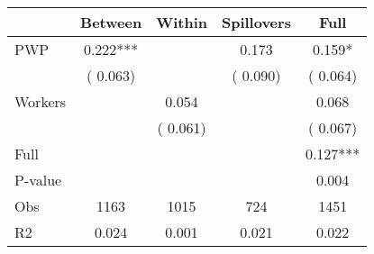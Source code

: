 
\begin{tabular}{l*{4}{c}}\hline&\multicolumn{1}{c}{Between}&\multicolumn{1}{c}{Within}&\multicolumn{1}{c}{Spillovers}&\multicolumn{1}{c}{Full}\\ \hline
 PWP           &              0.222***      &                                               &        0.173 &         0.159*                            \\ 
                               &        (       0.063)           &                                       &       (       0.090)     &      (       0.064)                                           \\ 
 Workers       &                                               &        0.054    &                                &             0.068                            \\ 
                               &                                               & (       0.061)                  &                                        &      (       0.067)                                           \\ 
\hline                                                                                                                                                                                                                                            
 Full                  &                                               &                                               &                                        &             0.127***                                     \\ 
 P-value               &                                               &                                               &                                        &             0.004                                           \\ 
 Obs                   &               1163               &       1015                       &       724                &              1451                                               \\ 
 R2                    &                      0.024              &              0.001                      &              0.021               &                     0.022                                              \\ 
\hline \end{tabular}                                                                                                                                                                                                              